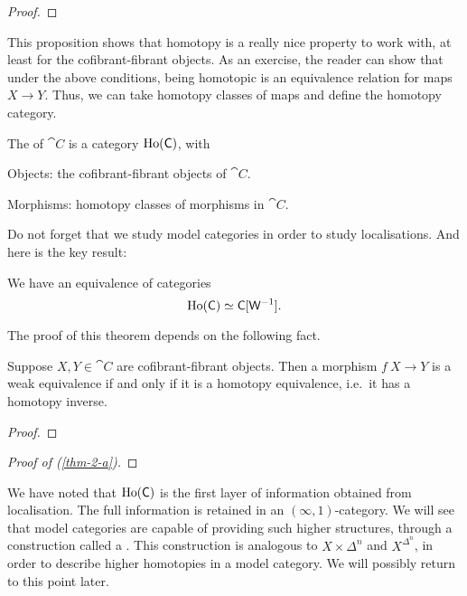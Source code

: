 \begin{proof}
    \nyw
\end{proof}

This proposition shows that
homotopy is a really nice property to work with,
at least for the cofibrant-fibrant objects.
As an exercise, the reader can show that
under the above conditions,
being homotopic is an equivalence relation for maps $X\to Y$.
Thus, we can take homotopy classes of maps and
define the homotopy category.

\begin{definition}
    The  of $\cat{C}$ is a category $\operatorname{Ho}(\mathsf{C})$, with
    \begin{itms}
        \item Objects: the cofibrant-fibrant objects of $\cat{C}$.
        \item Morphisms: homotopy classes of morphisms in $\cat{C}$.
    \end{itms}
\end{definition}

Do not forget that we study model categories
in order to study localisations.
And here is the key result:

\begin{theorem}\label{thm-2-a}
    We have an equivalence of categories
    \[\operatorname{Ho}(\mathsf{C})\simeq\mathsf{C}[\mathsf{W}^{-1}].\]
\end{theorem}

The proof of this theorem depends on the following fact.

\begin{proposition}\label{thm-2-w}
    Suppose $X,Y\in\cat C$ are cofibrant-fibrant objects.
    Then a morphism $f\:X\to Y$ is a weak equivalence
    if and only if it is a homotopy equivalence,
    i.e.\ it has a homotopy inverse.
\end{proposition}

\begin{proof}
    \nyw
\end{proof}

\begin{proof}[Proof of \textup{(\ref{thm-2-a})}]
    \nyw
\end{proof}

\begin{remark}
    We have noted that $\operatorname{Ho}(\mathsf{C})$
    is the first layer of information obtained from localisation.
    The full information is retained in an $(\infty,1)$-category.
    We will see that model categories are capable of providing
    such higher structures,
    through a construction called a .
    This construction is analogous to $X\times\Delta^n$ and $X^{\Delta^n}$,
    in order to describe higher homotopies in a model category.
    We will possibly return to this point later. \varqed
\end{remark}

